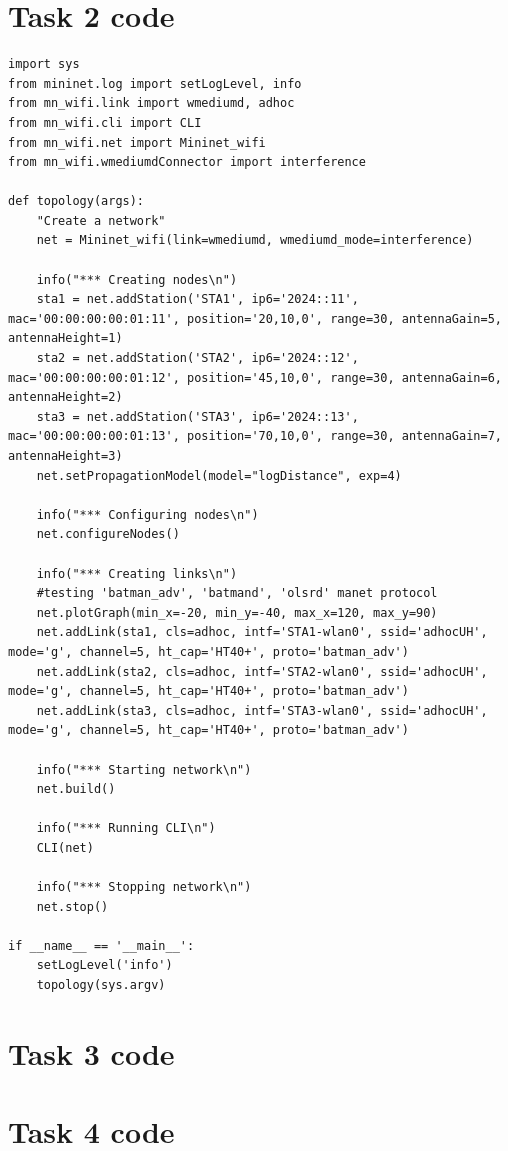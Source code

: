 \documentclass{article}
\begin{document}
\newpage
\section{Task 2 code}
\begin{lstlisting}
import sys
from mininet.log import setLogLevel, info
from mn_wifi.link import wmediumd, adhoc
from mn_wifi.cli import CLI
from mn_wifi.net import Mininet_wifi
from mn_wifi.wmediumdConnector import interference

def topology(args):
    "Create a network"
    net = Mininet_wifi(link=wmediumd, wmediumd_mode=interference) 

    info("*** Creating nodes\n")
    sta1 = net.addStation('STA1', ip6='2024::11', mac='00:00:00:00:01:11', position='20,10,0', range=30, antennaGain=5, antennaHeight=1)
    sta2 = net.addStation('STA2', ip6='2024::12', mac='00:00:00:00:01:12', position='45,10,0', range=30, antennaGain=6, antennaHeight=2)
    sta3 = net.addStation('STA3', ip6='2024::13', mac='00:00:00:00:01:13', position='70,10,0', range=30, antennaGain=7, antennaHeight=3)
    net.setPropagationModel(model="logDistance", exp=4)

    info("*** Configuring nodes\n")
    net.configureNodes()

    info("*** Creating links\n")
    #testing 'batman_adv', 'batmand', 'olsrd' manet protocol
    net.plotGraph(min_x=-20, min_y=-40, max_x=120, max_y=90)
    net.addLink(sta1, cls=adhoc, intf='STA1-wlan0', ssid='adhocUH', mode='g', channel=5, ht_cap='HT40+', proto='batman_adv')
    net.addLink(sta2, cls=adhoc, intf='STA2-wlan0', ssid='adhocUH', mode='g', channel=5, ht_cap='HT40+', proto='batman_adv')
    net.addLink(sta3, cls=adhoc, intf='STA3-wlan0', ssid='adhocUH', mode='g', channel=5, ht_cap='HT40+', proto='batman_adv')
    
    info("*** Starting network\n")
    net.build()

    info("*** Running CLI\n")
    CLI(net)

    info("*** Stopping network\n")
    net.stop()

if __name__ == '__main__':
    setLogLevel('info')
    topology(sys.argv)
\end{lstlisting}

\newpage
\section{Task 3 code}
\section{Task 4 code}
\end{document}
